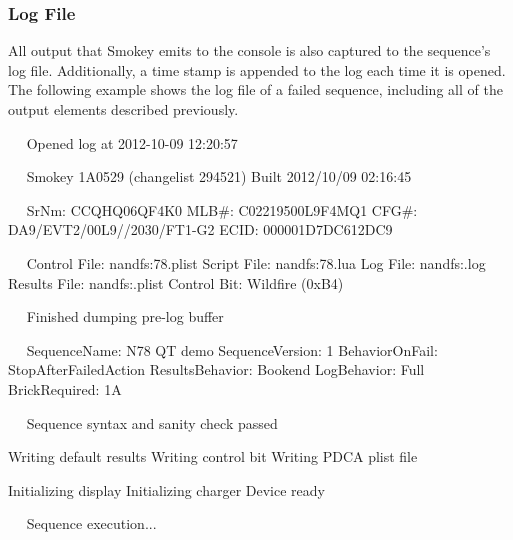 \documentclass[11pt]{article}
\renewcommand{\mp}[1]{%
		\makebox[0in][r]{%
			\color{SmokeyDarkBlue}%
			\raisebox{0in}[0in][0in]{%
				\fbox{%
					\normalfont\bfseries\scriptsize##1%
					}%
				}%
			\rule[0.5ex]{2em}{\fboxrule}%
			\hspace{3pt}%
			}%
		}%
\begin{document}
\subsubsection{Log File}

All output that Smokey emits to the console is also captured to the sequence's
log file.  Additionally, a time stamp is appended to the log each time it is
opened.  The following example shows the log file of a failed sequence,
including all of the output elements described previously.

\begin{AnnotedLogFile}
~\mp{Log Info}~Opened log at 2012-10-09 12:20:57

~\mp{1. SW Build}~Smokey 1A0529 (changelist 294521)
Built 2012/10/09 02:16:45

~\mp{2. Device ID}~SrNm: CCQHQ06QF4K0
MLB#: C02219500L9F4MQ1
CFG#: DA9/EVT2/00L9//2030/FT1-G2
ECID: 000001D7DC612DC9

~\mp{3. Seq. Files}~Control File: nandfs:\AppleInternal\Diags\Logs\Smokey\Wildfire\N78.plist
Script File:  nandfs:\AppleInternal\Diags\Logs\Smokey\Wildfire\N78.lua
Log File:     nandfs:\AppleInternal\Diags\Logs\Smokey\Wildfire\Smokey.log
Results File: nandfs:\AppleInternal\Diags\Logs\Smokey\Wildfire\PDCA.plist
Control Bit:  Wildfire (0xB4)

~\mp{Log Info}~Finished dumping pre-log buffer

~\mp{4. Seq. Props}~SequenceName:    N78 QT demo
SequenceVersion: 1
BehaviorOnFail:  StopAfterFailedAction
ResultsBehavior: Bookend
LogBehavior:     Full
BrickRequired:   1A

~\mp{5. Pre-flight}~Sequence syntax and sanity check passed

Writing default results
Writing control bit
Writing PDCA plist file

Initializing display
Initializing charger
Device ready

~\mp{6. Test Trace}~Sequence execution...


\end{AnnotedLogFile}
\end{document}
